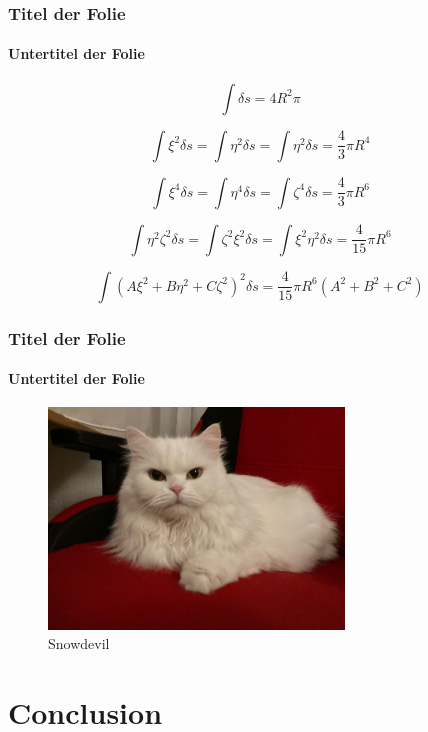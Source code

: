 \begin{frame}
\frametitle{Titel der Folie}
\framesubtitle{Untertitel der Folie}


\[ \int \delta s = 4 R^2 \pi \]

\[\int \xi^2 \delta s = \int \eta^2 \delta s = \int \eta^2 \delta s = \frac{4}{3} \pi R^4 \]

\[\int \xi^4 \delta s = \int \eta^4 \delta s = \int \zeta^4 \delta s = \frac{4}{3} \pi R^6 \]

\[\int \eta^2 \zeta^2 \delta s = \int \zeta^2 \xi^2 \delta s = \int \xi^2 \eta^2 \delta s = \frac{4}{15} \pi R^6 \]

\[\int \left( A \xi^2 + B \eta^2+ C \zeta^2 \right)^2 \delta s = \frac{4}{15} \pi R^6 \left( A^2 + B^2 + C^2 \right)\]

\end{frame}


\begin{frame}
\frametitle{Titel der Folie}
\framesubtitle{Untertitel der Folie}

\begin{figure}
\begin{center}
\includegraphics[width=0.7\textwidth]{./IncludedPictures/Cat}
\caption{Snowdevil}
\end{center}
\end{figure}

\end{frame}

\section{Conclusion}

